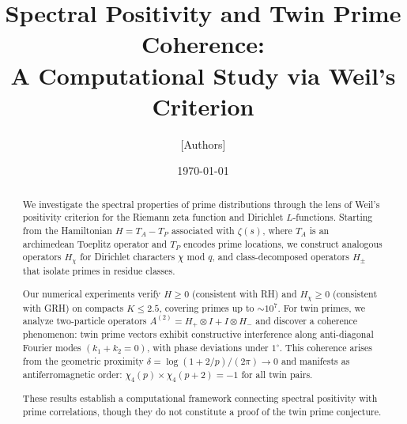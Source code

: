 


\title{Spectral Positivity and Twin Prime Coherence:\\
A Computational Study via Weil's Criterion}

\author{[Authors]}

\date{\today}



\maketitle

\begin{center}
\end{center}

\begin{abstract}
We investigate the spectral properties of prime distributions through the lens of Weil's positivity criterion for the Riemann zeta function and Dirichlet $L$-functions. Starting from the Hamiltonian $H = T_A - T_P$ associated with $\zeta(s)$, where $T_A$ is an archimedean Toeplitz operator and $T_P$ encodes prime locations, we construct analogous operators $H_\chi$ for Dirichlet characters $\chi$ mod $q$, and class-decomposed operators $H_\pm$ that isolate primes in residue classes.

Our numerical experiments verify $H \geq 0$ (consistent with RH) and $H_\chi \geq 0$ (consistent with GRH) on compacts $K \leq 2.5$, covering primes up to $\sim 10^7$. For twin primes, we analyze two-particle operators $A^{(2)} = H_+ \otimes I + I \otimes H_-$ and discover a coherence phenomenon: twin prime vectors exhibit constructive interference along anti-diagonal Fourier modes $(k_1 + k_2 = 0)$, with phase deviations under $1^\circ$. This coherence arises from the geometric proximity $\delta = \log(1+2/p)/(2\pi) \to 0$ and manifests as antiferromagnetic order: $\chi_4(p) \times \chi_4(p+2) = -1$ for all twin pairs.

These results establish a computational framework connecting spectral positivity with prime correlations, though they do not constitute a proof of the twin prime conjecture.
\end{abstract}


